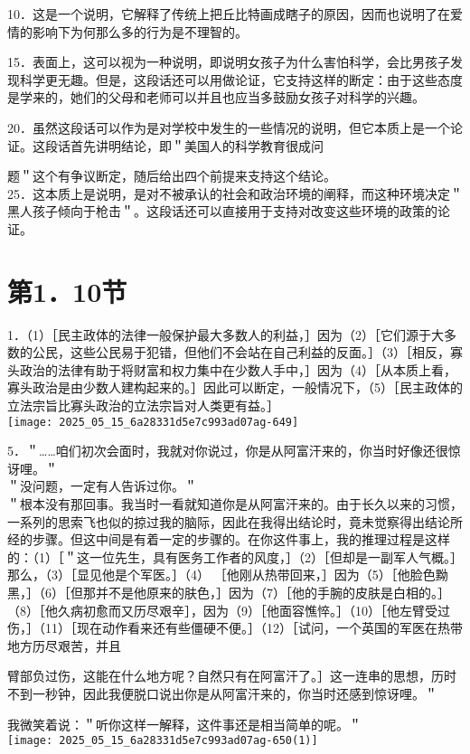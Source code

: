 10．这是一个说明，它解释了传统上把丘比特画成瞎子的原因，因而也说明了在爱情的影响下为何那么多的行为是不理智的。

15．表面上，这可以视为一种说明，即说明女孩子为什么害怕科学，会比男孩子发现科学更无趣。但是，这段话还可以用做论证，它支持这样的断定：由于这些态度是学来的，她们的父母和老师可以并且也应当多鼓励女孩子对科学的兴趣。

20．虽然这段话可以作为是对学校中发生的一些情况的说明，但它本质上是一个论证。这段话首先讲明结论，即＂美国人的科学教育很成问

题＂这个有争议断定，随后给出四个前提来支持这个结论。\\
25．这本质上是说明，是对不被承认的社会和政治环境的阐释，而这种环境决定＂黑人孩子倾向于枪击＂。这段话还可以直接用于支持对改变这些环境的政策的论证。

\section*{第1．10节}
1．（1）［民主政体的法律一般保护最大多数人的利益，］因为（2）［它们源于大多数的公民，这些公民易于犯错，但他们不会站在自己利益的反面。］（3）［相反，寡头政治的法律有助于将财富和权力集中在少数人手中，］因为（4）［从本质上看，寡头政治是由少数人建构起来的。］因此可以断定，一般情况下，（5）［民主政体的立法宗旨比寡头政治的立法宗旨对人类更有益。］\\
\texttt{[image: 2025\_05\_15\_6a28331d5e7c993ad07ag-649]}

5．＂……咱们初次会面时，我就对你说过，你是从阿富汗来的，你当时好像还很惊讶哩。＂\\
＂没问题，一定有人告诉过你。＂\\
＂根本没有那回事。我当时一看就知道你是从阿富汗来的。由于长久以来的习惯，一系列的思索飞也似的掠过我的脑际，因此在我得出结论时，竟未觉察得出结论所经的步骤。但这中间是有着一定的步骤的。在你这件事上，我的推理过程是这样的：（1）［＂这一位先生，具有医务工作者的风度，］（2）［但却是一副军人气概。］那么，（3）［显见他是个军医。］（4） ［他刚从热带回来，］因为（5）［他脸色黝黑，］（6）［但那并不是他原来的肤色，］因为（7）［他的手腕的皮肤是白相的。］（8）［他久病初愈而又历尽艰辛］，因为（9）［他面容憔悴。］（10）［他左臂受过伤，］（11）［现在动作看来还有些僵硬不便。］（12）［试问，一个英国的军医在热带地方历尽艰苦，并且

臂部负过伤，这能在什么地方呢？自然只有在阿富汗了。］这一连串的思想，历时不到一秒钟，因此我便脱口说出你是从阿富汗来的，你当时还感到惊讶哩。＂

我微笑着说：＂听你这样一解释，这件事还是相当简单的呢。＂\\
\texttt{[image: 2025\_05\_15\_6a28331d5e7c993ad07ag-650(1)]}

